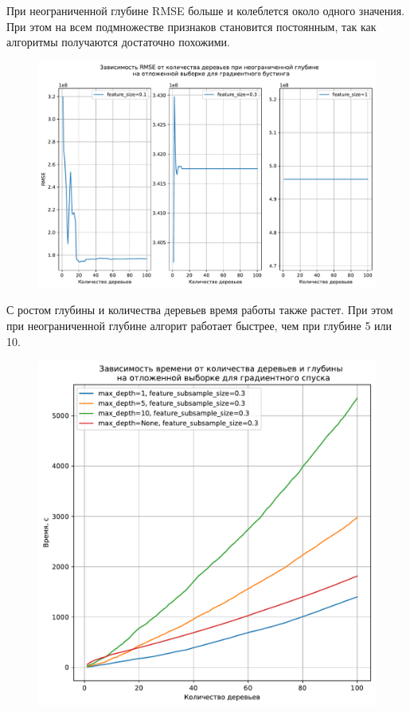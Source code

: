 \documentclass[a4paper, 12pt]{report}
\begin{document}
При неограниченной глубине RMSE больше и колеблется около одного значения. При этом на всем подмножестве признаков становится постоянным, так как алгоритмы получаются достаточно похожими.

\begin{figure}[H]
        	\centering
        	\includegraphics[width=1\linewidth]{ex2_2.pdf}
        	\label{fig:mpr}
        	\vspace{-25pt}
\end{figure}

С ростом глубины и количества деревьев время работы также растет. При этом при неограниченной глубине алгорит работает быстрее, чем при глубине 5 или 10.

\begin{figure}[H]
        	\centering
        	\includegraphics[width=0.7\linewidth]{ex2_3.pdf}
        	\label{fig:mpr}
        	\vspace{-25pt}
\end{figure}
\end{document}
